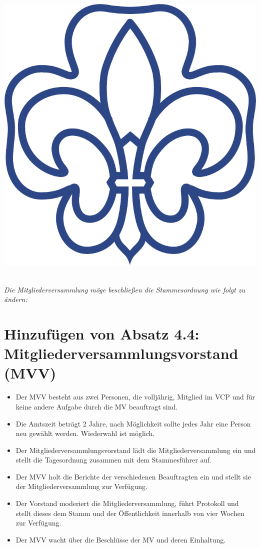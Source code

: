 \documentclass[a4paper]{article}
\begin{document}
\begin{center}
\begin{minipage}{.2\textwidth}
        \includegraphics[width=.85\linewidth]{Zeichen.pdf}
    \end{minipage}%
\end{center}
~\\[1cm] 

\emph{Die Mitgliederversammlung möge beschließen die Stammesordnung wie folgt zu ändern:}

\section{Hinzufügen von Absatz 4.4: Mitgliederversammlungsvorstand (MVV)} %
\label{sec:hinzufugen_von_absatz_4_4_mitgliederversammlungsvorstand}
	\begin{itemize}
		\item Der MVV besteht aus zwei Personen, die volljährig, Mitglied im VCP und für keine andere Aufgabe durch die MV beauftragt sind. 
		\item Die Amtszeit beträgt 2 Jahre, nach Möglichkeit sollte jedes Jahr eine Person neu gewählt werden. Wiederwahl ist möglich. 
		\item Der Mitgliederversammlungsvorstand lädt die Mitgliederversammlung ein und stellt die Tagesordnung zusammen mit dem Stammesführer auf. 
		\item Der MVV holt die Berichte der verschiedenen Beauftragten ein und stellt sie der Mitgliederversammlung zur Verfügung. 
		\item Der Vorstand moderiert die Mitgliederversammlung, führt Protokoll und stellt dieses dem Stamm und der Öffentlichkeit innerhalb von vier Wochen zur Verfügung. 
		\item Der MVV wacht über die Beschlüsse der MV und deren Einhaltung. 
	\end{itemize}
\end{document}
